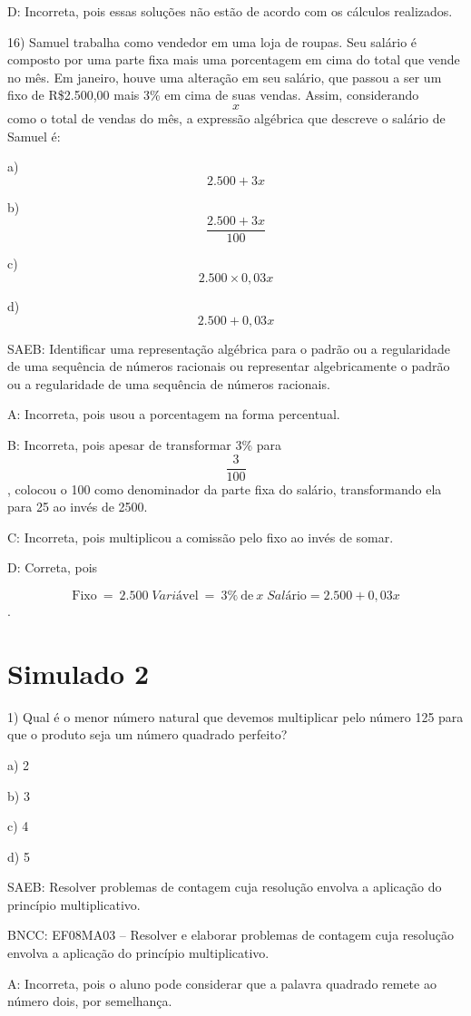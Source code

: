 D: Incorreta, pois essas soluções não estão de acordo com os cálculos
realizados.

16) Samuel trabalha como vendedor em uma loja de roupas. Seu salário é
composto por uma parte fixa mais uma porcentagem em cima do total que
vende no mês. Em janeiro, houve uma alteração em seu salário, que passou
a ser um fixo de R\$2.500,00 mais 3\% em cima de suas vendas. Assim,
considerando \[x\] como o total de vendas do mês, a expressão algébrica
que descreve o salário de Samuel é:

a) \[2.500 + 3x\]

b) \[\frac{2.500 + 3x}{100}\]

c) \[2.500 \times 0,03x\]

d) \[2.500 + 0,03x\]

SAEB: Identificar uma representação algébrica para o padrão ou a
regularidade de uma sequência de números racionais ou representar
algebricamente o padrão ou a regularidade de uma sequência de números
racionais.

A: Incorreta, pois usou a porcentagem na forma percentual.

B: Incorreta, pois apesar de transformar 3\% para \[\frac{3}{100}\],
colocou o 100 como denominador da parte fixa do salário, transformando
ela para 25 ao invés de 2500.

C: Incorreta, pois multiplicou a comissão pelo fixo ao invés de somar.

D: Correta, pois

\[\text{Fixo}\ = \ 2.500 \; {Vari}á\text{vel}\  = \ 3\%\ \text{de}\ x \; {Sal}á\text{rio} = 2.500 + 0,03x\].


\section{Simulado 2}

1) Qual é o menor número natural que devemos multiplicar pelo número 125
para que o produto seja um número quadrado perfeito?

a) 2

b) 3

c) 4

d) 5

SAEB: Resolver problemas de contagem cuja resolução envolva a aplicação
do princípio multiplicativo.

BNCC: EF08MA03 -- Resolver e elaborar problemas de contagem cuja
resolução envolva a aplicação do princípio multiplicativo.

A: Incorreta, pois o aluno pode considerar que a palavra quadrado remete
ao número dois, por semelhança.

